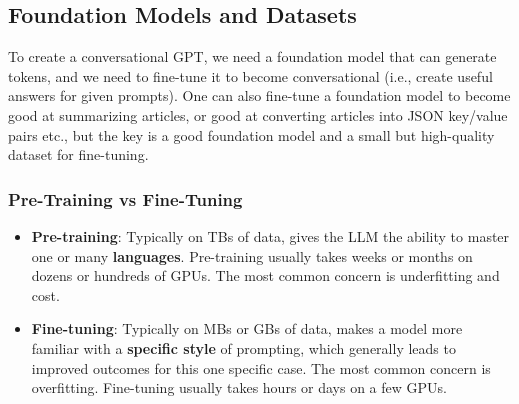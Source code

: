 \documentclass{article}
\begin{document}
\subsection{Foundation Models and Datasets}
To create a conversational GPT, we need a foundation model that can generate tokens, and we need to fine-tune it to become conversational (i.e., create useful answers for given prompts). One can also fine-tune a foundation model to become good at summarizing articles, or good at converting articles into JSON key/value pairs etc., but the key is a good foundation model and a small but high-quality dataset for fine-tuning.

\subsubsection{Pre-Training vs Fine-Tuning}
\begin{itemize}
    \item \textbf{Pre-training}: Typically on TBs of data, gives the LLM the ability to master one or many \textbf{languages}. Pre-training usually takes weeks or months on dozens or hundreds of GPUs. The most common concern is underfitting and cost.
    \item \textbf{Fine-tuning}: Typically on MBs or GBs of data, makes a model more familiar with a \textbf{specific style} of prompting, which generally leads to improved outcomes for this one specific case. The most common concern is overfitting. Fine-tuning usually takes hours or days on a few GPUs. 
\end{itemize}
\end{document}
